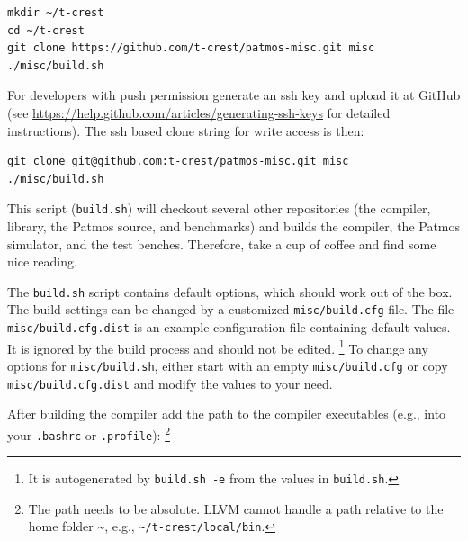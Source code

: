 \documentclass[a4paper,fontsize=10pt,twoside,DIV15,BCOR12mm,headinclude=true,footinclude=false,pagesize,bibtotoc]{scrbook}
\newcommand{\code}[1]{{\texttt{#1}}}
\newcommand{\comment}[3]{

\textsf{\textbf{#1}} {\color{#3}#2}}
\newcommand{\martin}[1]{\comment{Martin}{#1}{Blue}}
\newcommand{\stefan}[1]{\comment{Stefan}{#1}{RoyalPurple}}
\renewcommand{\martin}[1]{}
\renewcommand{\stefan}[1]{}
\begin{document}
\begin{verbatim}
mkdir ~/t-crest
cd ~/t-crest
git clone https://github.com/t-crest/patmos-misc.git misc
./misc/build.sh
\end{verbatim}

For developers with push permission generate an ssh key and upload
it at GitHub (see \url{https://help.github.com/articles/generating-ssh-keys}
for detailed instructions).
The ssh based clone string for write access is then:

\begin{verbatim}
git clone git@github.com:t-crest/patmos-misc.git misc
./misc/build.sh
\end{verbatim}

This script (\code{build.sh}) will checkout several other repositories (the compiler, library,
the Patmos source, and benchmarks) and
builds the compiler, the Patmos simulator, and the test benches.
Therefore, take a cup of coffee and find some nice reading.

The \code{build.sh} script contains default options, which should work out of the box. 
The build settings can be changed by a customized \code{misc/build.cfg} file. The file \code{misc/build.cfg.dist}
is an example configuration file containing default values. It is ignored by the build process and should not be edited.
\footnote{It is autogenerated by \code{build.sh -e} from the values in \code{build.sh}.}
To change any options for \code{misc/build.sh}, either start with an empty \code{misc/build.cfg} or
copy \code{misc/build.cfg.dist} and modify the values to your need.

After building the compiler add the path
to the compiler executables (e.g., into your \code{.bashrc} or \code{.profile}):
\footnote{The path needs to be absolute. LLVM cannot handle
a path relative to the home folder \textasciitilde{}, e.g., \code{\textasciitilde{}/t-crest/local/bin}.}

\martin{In Mac OS X I have only .profile and I don't understand what the issue by 'only read by login terminals'.}
\stefan{Login shells are only opened at logins. Interactive terminals are all terminals that are opened by your window manager or
other means. This is why you need to reboot to have .profile take effect. There are slight differences between bash and zsh when which file is read, 
and distribution further mix up the files in non-standard ways.}
\end{document}
